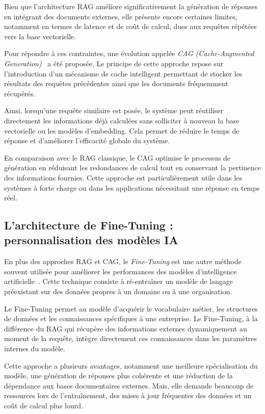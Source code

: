 Bien que l’architecture RAG améliore significativement la génération de réponses en intégrant des documents externes, elle présente encore certaines limites, notamment en termes de latence et de coût de calcul, dues aux requêtes répétées vers la base vectorielle.

Pour répondre à ces contraintes, une évolution appelée \textit{CAG (Cache-Augmented Generation)}~\cite{chan2024cag} a été proposée. Le principe de cette approche repose sur l’introduction d’un mécanisme de cache intelligent permettant de stocker les résultats des requêtes précédentes ainsi que les documents fréquemment récupérés.

Ainsi, lorsqu’une requête similaire est posée, le système peut réutiliser directement les informations déjà calculées sans solliciter à nouveau la base vectorielle ou les modèles d’embedding. Cela permet de réduire le temps de réponse et d’améliorer l’efficacité globale du système.

En comparaison avec le RAG classique, le CAG optimise le processus de génération en réduisant les redondances de calcul tout en conservant la pertinence des informations fournies. Cette approche est particulièrement utile dans les systèmes à forte charge ou dans les applications nécessitant une réponse en temps réel.
\subsection{L'architecture de Fine-Tuning : personnalisation des modèles IA}

En plus des approches RAG et CAG, le \textit{Fine-Tuning} est une autre méthode souvent utilisée pour améliorer les performances des modèles d'intelligence artificielle~\cite{devlin2019bert}. Cette technique consiste à ré-entraîner un modèle de langage préexistant sur des données propres à un domaine ou à une organisation.

Le Fine-Tuning permet au modèle d’acquérir le vocabulaire métier, les structures de données et les connaissances spécifiques à une entreprise. Le Fine-Tuning, à la différence du RAG qui récupère des informations externes dynamiquement au moment de la requête, intègre directement ces connaissances dans les paramètres internes du modèle.

Cette approche a plusieurs avantages, notamment une meilleure spécialisation du modèle, une génération de réponses plus cohérente et une réduction de la dépendance aux bases documentaires externes. Mais, elle demande beaucoup de ressources lors de l’entraînement, des mises à jour fréquentes des données et un coût de calcul plus lourd.

